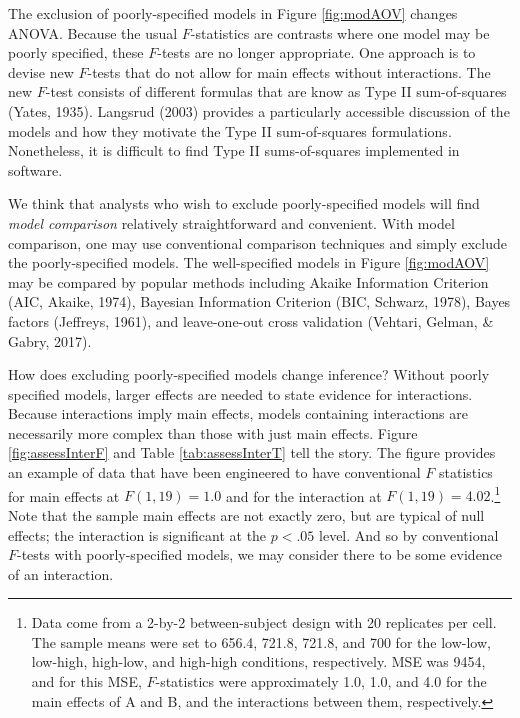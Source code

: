\documentclass[
  english,
  ,man]{apa6}
\begin{document}
The exclusion of poorly-specified models in Figure \ref{fig:modAOV} changes ANOVA. Because the usual \(F\)-statistics are contrasts where one model may be poorly specified, these \(F\)-tests are no longer appropriate. One approach is to devise new \(F\)-tests that do not allow for main effects without interactions. The new \(F\)-test consists of different formulas that are know as Type II sum-of-squares (Yates, 1935). Langsrud (2003) provides a particularly accessible discussion of the models and how they motivate the Type II sum-of-squares formulations. Nonetheless, it is difficult to find Type II sums-of-squares implemented in software.

We think that analysts who wish to exclude poorly-specified models will find \emph{model comparison} relatively straightforward and convenient. With model comparison, one may use conventional comparison techniques and simply exclude the poorly-specified models. The well-specified models in Figure \ref{fig:modAOV} may be compared by popular methods including Akaike Information Criterion (AIC, Akaike, 1974), Bayesian Information Criterion (BIC, Schwarz, 1978), Bayes factors (Jeffreys, 1961), and leave-one-out cross validation (Vehtari, Gelman, \& Gabry, 2017).

How does excluding poorly-specified models change inference? Without poorly specified models, larger effects are needed to state evidence for interactions. Because interactions imply main effects, models containing interactions are necessarily more complex than those with just main effects. Figure \ref{fig:assessInterF} and Table \ref{tab:assessInterT} tell the story. The figure provides an example of data that have been engineered to have conventional \(F\) statistics for main effects at \(F(1,19)=1.0\) and for the interaction at \(F(1,19)=4.02\).\footnote{Data come from a 2-by-2 between-subject design with 20 replicates per cell. The sample means were set to 656.4, 721.8, 721.8, and 700 for the low-low, low-high, high-low, and high-high conditions, respectively. MSE was 9454, and for this MSE, \(F\)-statistics were approximately 1.0, 1.0, and 4.0 for the main effects of A and B, and the interactions between them, respectively.} Note that the sample main effects are not exactly zero, but are typical of null effects; the interaction is significant at the \(p<.05\) level. And so by conventional \(F\)-tests with poorly-specified models, we may consider there to be some evidence of an interaction.
\end{document}
